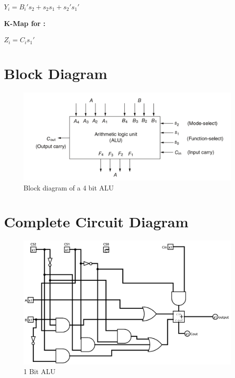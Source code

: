 \documentclass[a4paper]{article}
\begin{document}
$Y_i = B_i's_2 + s_2s_1 + s_2's_1'$

\newpage
\textbf{\large{K-Map for :}}
\newline
\begin{karnaugh-map}[4][4][1][$s_2s_1$][$C_is_0$]
\end{karnaugh-map}

$Z_i = C_is_1'$

\section{Block Diagram}

\begin{figure}[h]
    \includegraphics[width=\textwidth]{1. block diagram.png}
    \caption{Block diagram of a 4 bit ALU}
\end{figure}

\newpage
\section{Complete Circuit Diagram}

\begin{figure}[h]
    \includegraphics[width=\textwidth]{2. 1 bit alu.png}
    \caption{1 Bit ALU}
\end{figure}
\end{document}
